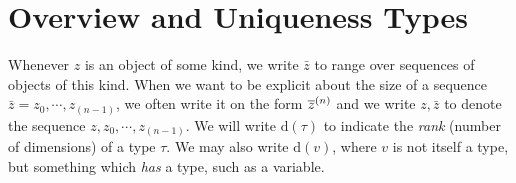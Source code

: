 \newcommand{\ft}{\phi}
\newcommand{\fts}{\varphi}
\newcommand{\tty}{\rho}
\newcommand{\sembox}[1]{\hfill \normalfont \mbox{\fbox{\(#1\)}}}
\newcommand{\sempart}[2]{\textrm{\textit{#1 \sembox{#2}}}}
\newcommand{\vdp}{\vd_\textrm{p}}
\newcommand{\vdP}{\vd_\textrm{P}}
\newcommand{\vda}{\vd_\textrm{a}}
\newcommand{\fracc}[2]{\begin{eqnarray} \frac{\begin{array}{c} #1
    \end{array}}{\begin{array}{c} #2 \end{array}} \end{eqnarray}}
\newcommand{\fraccn}[2]{\refstepcounter{equation}\mbox{$\frac{\begin{array}{c} #1 \end{array}}{\begin{array}{c} #2 \end{array}}$}~(\arabic{equation})}
\newcommand{\fraccc}[2]{\mbox{$\frac{\begin{array}{c} #1 \end{array}}{\begin{array}{c} #2 \end{array}}$}}
\newcommand{\fn}[3]{\texttt{\textbackslash}~#1~\Par{#2}\Rightarrow #3}
\newcommand{\ubar}[1]{\underline{#1}}
\newcommand{\utau}{\ubar{\tau}}
\newcommand{\usigma}{\ubar{\sigma}}
\newcommand{\Fun}[4]{\texttt{let}~#1~#2\Par{#3}\mbox{\texttt{~=~}}#4}
\newcommand{\Fn}[3]{\texttt{\textbackslash}}

\chapter{Overview and Uniqueness Types}

Whenever $z$ is an object of some kind, we write $\bar{z}$ to range
over sequences of objects of this kind. When we want to be explicit
about the size of a sequence $\bar{z} = z_0,\cdots,z_{(n-1)}$, we
often write it on the form $\overline{z}^{(n)}$ and we write $z,\bar{z}$ to
denote the sequence $z,z_0,\cdots,z_{(n-1)}$.  We will write
$\text{d}(\tau)$ to indicate the \emph{rank} (number of dimensions) of
a type $\tau$.  We may also write $\text{d}(v)$, where $v$ is not
itself a type, but something which {\em has} a type, such as a
variable.


